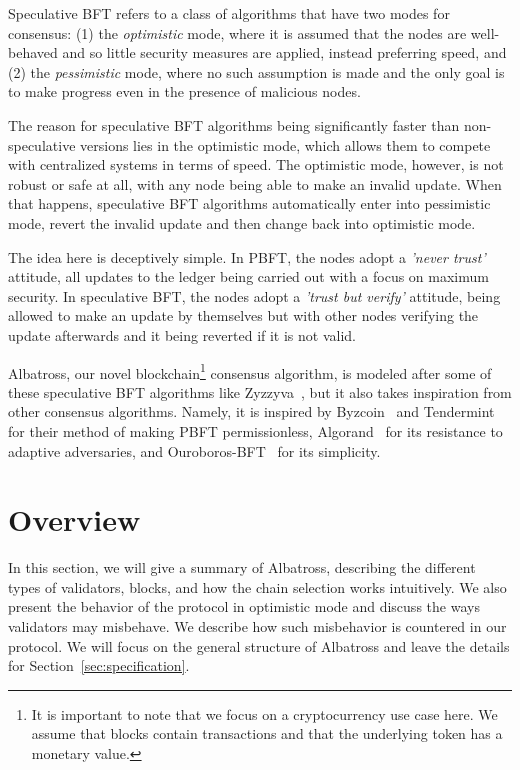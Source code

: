 \documentclass[conference]{IEEEtran}
\begin{document}
Speculative BFT refers to a class of algorithms that have two modes for consensus: (1) the \textit{optimistic} mode, where it is assumed that the nodes are well-behaved and so little security measures are applied, instead preferring speed, and (2) the \textit{pessimistic} mode, where no such assumption is made and the only goal is to make progress even in the presence of malicious nodes.

The reason for speculative BFT algorithms being significantly faster than non-speculative versions lies in the optimistic mode, which allows them to compete with centralized systems in terms of speed. The optimistic mode, however, is not robust or safe at all, with any node being able to make an invalid update. When that happens, speculative BFT algorithms automatically enter into pessimistic mode, revert the invalid update and then change back into optimistic mode.

The idea here is deceptively simple. In PBFT, the nodes adopt a \textit{'never trust'} attitude, all updates to the ledger being carried out with a focus on maximum security. In speculative BFT, the nodes adopt a \textit{'trust but verify'} attitude, being allowed to make an update by themselves but with other nodes verifying the update afterwards and it being reverted if it is not valid.

Albatross, our novel blockchain\footnote{It is important to note that we focus on a cryptocurrency use case here. We assume that blocks contain transactions and that the underlying token has a monetary value.} consensus algorithm, is modeled after some of these speculative BFT algorithms like Zyzzyva~\cite{kotla2007zyzzyva}, but it also takes inspiration from other consensus algorithms. Namely, it is inspired by Byzcoin~\cite{kogias2016enhancing} and Tendermint~\cite{buchman2018latest} for their method of making PBFT permissionless, Algorand~\cite{gilad2017algorand} for its resistance to adaptive adversaries, and Ouroboros-BFT~\cite{kiayias2018ouroboros} for its simplicity.

\section{Overview}
In this section, we will give a summary of Albatross, describing the different types of validators, blocks, and how the chain selection works intuitively. We also present the behavior of the protocol in optimistic mode and discuss the ways validators may misbehave. We describe how such misbehavior is countered in our protocol. We will focus on the general structure of Albatross and leave the details for Section~\ref{sec:specification}.
\end{document}
